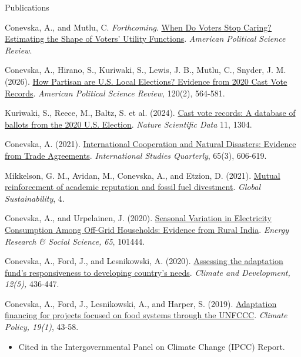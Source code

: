 \documentclass{resume}
\begin{document}
\begin{rSection}{\Large  P\MakeLowercase{ublications}} \itemsep -3pt {}
\vspace{-0.7cm}

\item Conevska, A., and Mutlu, C. \textit{Forthcoming}. \href{https://www.dropbox.com/scl/fi/rjh63qsvt3ny1yy1jl4kj/manuscript_accept.pdf?rlkey=ecyhap5xv6meq6mmjucsg8bkl&dl=0}{When Do Voters Stop Caring? Estimating the Shape of Voters' Utility Functions}. \textit{American Political Science Review}.
\medskip

\item Conevska, A., Hirano, S., Kuriwaki, S., Lewis, J. B., Mutlu, C., Snyder, J. M. (2026). \href{https://doi.org/10.1017/S0003055425100920}{How Partisan are U.S. Local Elections? Evidence from 2020 Cast Vote Records}. \textit{American Political Science Review}, 120(2), 564-581.
\medskip

\item Kuriwaki, S., Reece, M., Baltz, S. et al. (2024). \href{https://doi.org/10.1038/s41597-024-04017-1}{Cast vote records: A database of ballots from the 2020 U.S. Election}. \textit{Nature Scientific Data} 11, 1304.
\medskip

\item Conevska, A. (2021). \href{https://doi.org/10.1093/isq/sqab065}{International Cooperation and Natural Disasters: Evidence from Trade Agreements}. \textit{International Studies Quarterly},  65(3), 606-619.
\medskip

\item Mikkelson, G. M., Avidan, M., Conevska, A., and Etzion, D. (2021). \href{https://doi.org/10.1017/sus.2021.19}{Mutual reinforcement of academic reputation and fossil fuel divestment}. \textit{Global Sustainability}, 4.
\medskip

\item Conevska, A., and Urpelainen, J. (2020). \href{https://doi.org/10.1016/j.erss.2020.101444}{Seasonal Variation in Electricity Consumption Among Off-Grid Households: Evidence from Rural India}. \textit{ Energy Research \& Social Science, 65}, 101444. 
\medskip

\item Conevska, A., Ford, J., and Lesnikowski, A. (2020). \href{https://doi.org/10.1080/17565529.2019.1638225}{Assessing the adaptation fund’s responsiveness to developing country’s needs}. \textit{Climate and Development, 12(5),} 436-447. 
\medskip

\item Conevska, A., Ford, J., Lesnikowski, A., and Harper, S. (2019). \href{https://doi.org/10.1080/14693062.2018.1466682}{Adaptation financing for projects focused on food systems through the UNFCCC}. \textit{Climate Policy, 19(1)}, 43-58. 
\begin{itemize}
    \item Cited in the Intergovernmental Panel on Climate Change (IPCC) Report.
\end{itemize}

\end{rSection}
\end{document}
